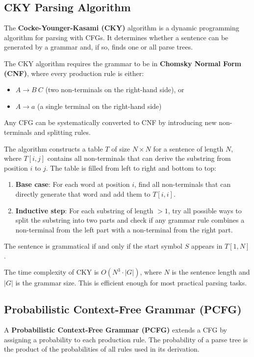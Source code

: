 \documentclass[11pt,a4paper]{article}
\begin{document}
\subsection{CKY Parsing Algorithm}

The \textbf{Cocke-Younger-Kasami (CKY)} algorithm is a dynamic programming algorithm for parsing with CFGs. It determines whether a sentence can be generated by a grammar and, if so, finds one or all parse trees.

The CKY algorithm requires the grammar to be in \textbf{Chomsky Normal Form (CNF)}, where every production rule is either:
\begin{itemize}
    \item $A \to B \ C$ (two non-terminals on the right-hand side), or
    \item $A \to a$ (a single terminal on the right-hand side)
\end{itemize}

Any CFG can be systematically converted to CNF by introducing new non-terminals and splitting rules.

The algorithm constructs a table $T$ of size $N \times N$ for a sentence of length $N$, where $T[i, j]$ contains all non-terminals that can derive the substring from position $i$ to $j$. The table is filled from left to right and bottom to top:
\begin{enumerate}
    \item \textbf{Base case}: For each word at position $i$, find all non-terminals that can directly generate that word and add them to $T[i, i]$.
    \item \textbf{Inductive step}: For each substring of length $> 1$, try all possible ways to split the substring into two parts and check if any grammar rule combines a non-terminal from the left part with a non-terminal from the right part.
\end{enumerate}

The sentence is grammatical if and only if the start symbol $S$ appears in $T[1, N]$.

The time complexity of CKY is $O(N^3 \cdot |G|)$, where $N$ is the sentence length and $|G|$ is the grammar size. This is efficient enough for most practical parsing tasks.

\subsection{Probabilistic Context-Free Grammar (PCFG)}

A \textbf{Probabilistic Context-Free Grammar (PCFG)} extends a CFG by assigning a probability to each production rule. The probability of a parse tree is the product of the probabilities of all rules used in its derivation.
\end{document}
